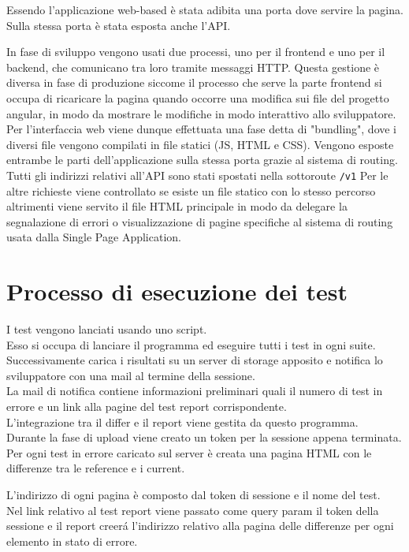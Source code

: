         Essendo l'applicazione web-based è stata adibita una porta dove servire la pagina.
        Sulla stessa porta è stata esposta anche l'API.
        
        In fase di sviluppo vengono usati due processi, uno per il frontend e uno per il backend, che comunicano tra loro tramite messaggi HTTP.
        Questa gestione è diversa in fase di produzione siccome il processo che serve la parte frontend si occupa di ricaricare la pagina quando occorre una modifica sui file del progetto angular, in modo da mostrare le modifiche in modo interattivo allo sviluppatore.
        Per l'interfaccia web viene dunque effettuata una fase detta di "bundling", dove i diversi file  vengono compilati in file statici (JS, HTML e CSS).
        Vengono esposte entrambe le parti dell'applicazione sulla stessa porta grazie al sistema di routing.
        Tutti gli indirizzi relativi all'API sono stati spostati nella sottoroute \verb|/v1|
        Per le altre richieste viene controllato se esiste un file statico con lo stesso percorso altrimenti viene servito il file HTML principale in modo da delegare la segnalazione di errori o visualizzazione di pagine specifiche al sistema di routing usata dalla Single Page Application.

    \section{Processo di esecuzione dei test\label{testexecution}}
        I test vengono lanciati usando uno script.\\
        Esso si occupa di lanciare il programma ed eseguire tutti i test in ogni suite.\\
        Successivamente carica i risultati su un server di storage apposito e notifica lo sviluppatore con una mail al termine della sessione.\\

        La mail di notifica contiene informazioni preliminari quali il numero di test in errore e un link alla pagine del test report corrispondente.\\

        L'integrazione tra il differ e il report viene gestita da questo programma.\\
        Durante la fase di upload viene creato un token per la sessione appena terminata.\\
        Per ogni test in errore caricato sul server è creata una pagina HTML con le differenze tra le reference e i current.
        
        L'indirizzo di ogni pagina è composto dal token di sessione e il nome del test.\\
        Nel link relativo al test report viene passato come query param il token della sessione e il report creer\'a l'indirizzo relativo alla pagina delle differenze per ogni elemento in stato di errore.
